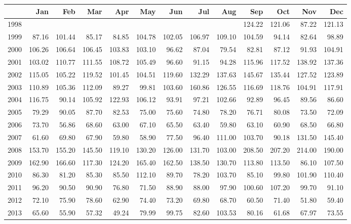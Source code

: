 \begin{longtable}{rrrrrrrrrrrrr}
  \hline
 & Jan & Feb & Mar & Apr & May & Jun & Jul & Aug & Sep & Oct & Nov & Dec \\ 
  \hline
1998 &  &  &  &  &  &  &  &  & 124.22 & 121.06 & 87.22 & 121.13 \\ 
  1999 & 87.16 & 101.44 & 85.17 & 84.85 & 104.78 & 102.05 & 106.97 & 109.10 & 104.59 & 94.14 & 82.64 & 98.89 \\ 
  2000 & 106.26 & 106.64 & 106.45 & 103.83 & 103.10 & 96.62 & 87.04 & 79.54 & 82.81 & 87.12 & 91.93 & 104.91 \\ 
  2001 & 103.02 & 110.77 & 111.55 & 108.72 & 105.49 & 96.60 & 91.15 & 94.28 & 115.96 & 117.52 & 138.92 & 137.36 \\ 
  2002 & 115.05 & 105.22 & 119.52 & 101.45 & 104.51 & 119.60 & 132.29 & 137.63 & 145.67 & 135.44 & 127.52 & 123.89 \\ 
  2003 & 110.89 & 105.36 & 112.09 & 89.27 & 99.81 & 103.60 & 160.86 & 126.55 & 116.69 & 118.76 & 104.91 & 117.91 \\ 
  2004 & 116.75 & 90.14 & 105.92 & 122.93 & 106.12 & 93.91 & 97.21 & 102.66 & 92.89 & 96.45 & 89.56 & 86.60 \\ 
  2005 & 79.29 & 90.05 & 87.70 & 82.53 & 75.00 & 75.60 & 74.80 & 78.20 & 76.71 & 80.08 & 73.50 & 72.09 \\ 
  2006 & 73.70 & 56.86 & 68.60 & 63.00 & 67.10 & 65.50 & 63.40 & 59.80 & 63.10 & 60.90 & 68.50 & 66.80 \\ 
  2007 & 61.60 & 69.80 & 67.90 & 59.80 & 58.90 & 77.50 & 96.40 & 111.00 & 103.70 & 90.18 & 131.50 & 145.40 \\ 
  2008 & 153.70 & 155.20 & 145.50 & 119.10 & 130.20 & 126.00 & 131.70 & 103.00 & 208.50 & 207.20 & 214.00 & 190.00 \\ 
  2009 & 162.90 & 166.60 & 117.30 & 124.20 & 165.40 & 162.50 & 138.50 & 130.70 & 113.80 & 113.50 & 86.10 & 107.50 \\ 
  2010 & 86.30 & 81.20 & 85.30 & 85.50 & 112.10 & 89.70 & 78.20 & 103.70 & 85.10 & 99.80 & 101.90 & 110.40 \\ 
  2011 & 96.20 & 90.50 & 90.90 & 76.80 & 71.50 & 88.90 & 88.00 & 97.90 & 100.60 & 107.20 & 99.70 & 91.10 \\ 
  2012 & 72.10 & 75.90 & 78.60 & 62.90 & 74.40 & 73.20 & 69.80 & 68.70 & 60.50 & 71.40 & 51.80 & 59.40 \\ 
  2013 & 65.60 & 55.90 & 57.32 & 49.24 & 79.99 & 99.75 & 82.60 & 103.53 & 80.16 & 61.68 & 67.97 & 73.55 \\ 

\end{longtable}

